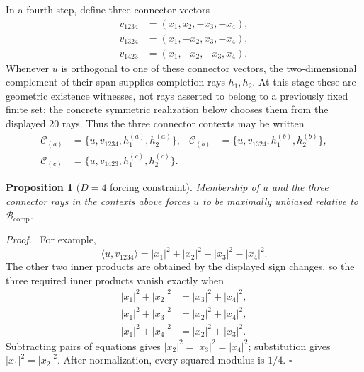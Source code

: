 \documentclass[%
  reprint,
  superscriptaddress,
  showpacs,
  showkeys,
  amsmath,amssymb,
  pra,
  longbibliography,
  floatfix,
  x11names
]{revtex4-2}
\newenvironment{revision}{\begingroup\color{revisionblue}}{\endgroup}
\newtheorem{proposition}{Proposition}
\newenvironment{proof}{\par\noindent\textit{Proof.}\ }{\hfill$\square$\par}
\begin{document}
In a fourth step, define three connector vectors
\begin{align*}
v_{1234}&=(x_1,x_2,-x_3,-x_4),\\
v_{1324}&=(x_1,-x_2,x_3,-x_4),\\
v_{1423}&=(x_1,-x_2,-x_3,x_4).
\end{align*}
\begin{revision}
Whenever $u$ is orthogonal to one of these connector vectors, the two-dimensional complement of their span supplies completion rays $h_1,h_2$.  At this stage these are geometric existence witnesses, not rays asserted to belong to a previously fixed finite set; the concrete symmetric realization below chooses them from the displayed 20 rays.  Thus the three connector contexts may be written
\begin{align*}
\mathcal{C}_{(a)}&=\{u,v_{1234},h^{(a)}_1,h^{(a)}_2\},&
\mathcal{C}_{(b)}&=\{u,v_{1324},h^{(b)}_1,h^{(b)}_2\},\\
\mathcal{C}_{(c)}&=\{u,v_{1423},h^{(c)}_1,h^{(c)}_2\}.
\end{align*}

\begin{proposition}[$D=4$ forcing constraint]
\label{prop:D4forcing}
Membership of $u$ and the three connector rays in the contexts above forces $u$ to be maximally unbiased relative to $\mathcal{B}_{\mathrm{comp}}$.
\end{proposition}

\begin{proof}
For example,
\[
\langle u,v_{1234}\rangle
=|x_1|^2+|x_2|^2-|x_3|^2-|x_4|^2.
\]
The other two inner products are obtained by the displayed sign changes, so the three required inner products vanish exactly when
\begin{align}
|x_1|^2+|x_2|^2&=|x_3|^2+|x_4|^2, \label{eq:D4a}\\
|x_1|^2+|x_3|^2&=|x_2|^2+|x_4|^2, \label{eq:D4b}\\
|x_1|^2+|x_4|^2&=|x_2|^2+|x_3|^2. \label{eq:D4c}
\end{align}
Subtracting pairs of equations gives $|x_2|^2=|x_3|^2=|x_4|^2$; substitution gives $|x_1|^2=|x_2|^2$.  After normalization, every squared modulus is $1/4$.
\end{proof}


\end{revision}
\end{document}
